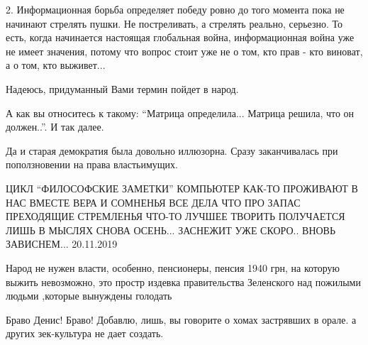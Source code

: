 \begin{itemize}
2. Информационная борьба определяет победу ровно до того момента пока не
начинают стрелять пушки. Не постреливать, а стрелять реально, серьезно. То
есть, когда начинается настоящая глобальная война, информационная война уже не
имеет значения, потому что вопрос стоит уже не о том, кто прав - кто виноват, а
о том, кто выживет...

Надеюсь, придуманный Вами термин пойдет в народ.


А как вы относитесь к такому: \enquote{Матрица определила... Матрица решила,
что он должен..}. И так далее.


Да и старая демократия была довольно иллюзорна. Сразу заканчивалась при
поползновении на права властьимущих.


\obeycr
ЦИКЛ \enquote{ФИЛОСОФСКИЕ ЗАМЕТКИ}
КОМПЬЮТЕР
КАК-ТО ПРОЖИВАЮТ В НАС
ВМЕСТЕ ВЕРА И СОМНЕНЬЯ
ВСЕ ДЕЛА ЧТО ПРО ЗАПАС
ПРЕХОДЯЩИЕ СТРЕМЛЕНЬЯ
ЧТО-ТО ЛУЧШЕЕ ТВОРИТЬ
ПОЛУЧАЕТСЯ ЛИШЬ В МЫСЛЯХ
СНОВА ОСЕНЬ... ЗАСНЕЖИТ
УЖЕ СКОРО.. ВНОВЬ ЗАВИСНЕМ...
20.11.2019
\restorecr


Народ не нужен власти, особенно, пенсионеры, пенсия 1940 грн, на которую выжить
невозможно, это простр издевка правительства Зеленского над пожилыми людьми
,которые вынуждены голодать



Браво Денис! Браво! Добавлю, лишь, вы говорите о хомах застрявших в орале. а
других зек-культура не дает создать.


\end{itemize} %
